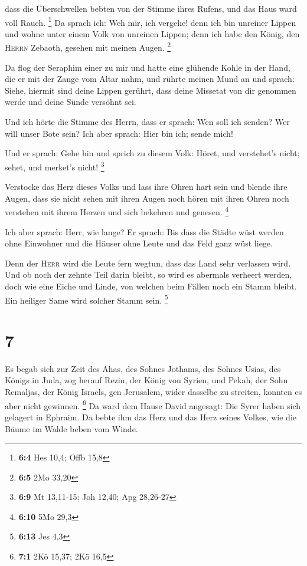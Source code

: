  dass die Überschwellen bebten von der Stimme ihres
Rufens, und das Haus ward voll Rauch. \footnote{\textbf{6:4} Hes 10,4;
  Offb 15,8}  Da sprach ich: Weh mir, ich vergehe! denn
ich bin unreiner Lippen und wohne unter einem Volk von unreinen Lippen;
denn ich habe den König, den \textsc{Herrn} Zebaoth, gesehen mit meinen
Augen. \footnote{\textbf{6:5} 2Mo 33,20}

 Da flog der Seraphim einer zu mir und hatte eine glühende
Kohle in der Hand, die er mit der Zange vom Altar nahm, 
und rührte meinen Mund an und sprach: Siehe, hiermit sind deine Lippen
gerührt, dass deine Missetat von dir genommen werde und deine Sünde
versöhnt sei.

 Und ich hörte die Stimme des Herrn, dass er sprach: Wen
soll ich senden? Wer will unser Bote sein? Ich aber sprach: Hier bin
ich; sende mich!

 Und er sprach: Gehe hin und sprich zu diesem Volk: Höret,
und verstehet's nicht; sehet, und merket's nicht! \footnote{\textbf{6:9}
  Mt 13,11-15; Joh 12,40; Apg 28,26-27}

 Verstocke das Herz dieses Volks und lass ihre Ohren hart
sein und blende ihre Augen, dass sie nicht sehen mit ihren Augen noch
hören mit ihren Ohren noch verstehen mit ihrem Herzen und sich bekehren
und genesen. \footnote{\textbf{6:10} 5Mo 29,3}

 Ich aber sprach: Herr, wie lange? Er sprach: Bis dass
die Städte wüst werden ohne Einwohner und die Häuser ohne Leute und das
Feld ganz wüst liege.

 Denn der \textsc{Herr} wird die Leute fern wegtun, dass
das Land sehr verlassen wird.  Und ob noch der zehnte
Teil darin bleibt, so wird es abermals verheert werden, doch wie eine
Eiche und Linde, von welchen beim Fällen noch ein Stamm bleibt. Ein
heiliger Same wird solcher Stamm sein. \footnote{\textbf{6:13} Jes 4,3}

\hypertarget{section-3}{%
\section{7}\label{section-3}}

 Es begab sich zur Zeit des Ahas, des Sohnes Jothams, des
Sohnes Usias, des Königs in Juda, zog herauf Rezin, der König von
Syrien, und Pekah, der Sohn Remaljas, der König Israels, gen Jerusalem,
wider dasselbe zu streiten, konnten es aber nicht gewinnen. \footnote{\textbf{7:1}
  2Kö 15,37; 2Kö 16,5}  Da ward dem Hause David angesagt:
Die Syrer haben sich gelagert in Ephraim. Da bebte ihm das Herz und das
Herz seines Volkes, wie die Bäume im Walde beben vom Winde.

